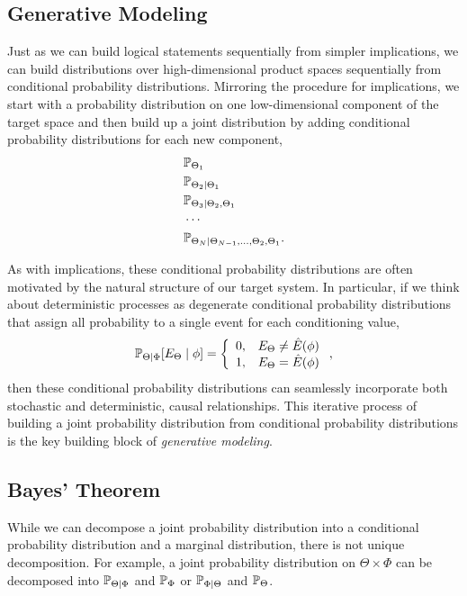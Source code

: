 \subsection{Generative Modeling}

Just as we can build logical statements sequentially from simpler
implications, we can build distributions over high-dimensional product
spaces sequentially from conditional probability distributions.  Mirroring the
procedure for implications, we start with a probability distribution on one 
low-dimensional component of the target space and then build up a joint 
distribution by adding conditional probability distributions for each new 
component,
%
\begin{align*}
& \mathbb{P}_{\Theta_{1}} \\
& \mathbb{P}_{\Theta_{2} \mid \Theta_{1}} \\
& \mathbb{P}_{\Theta_{3} \mid \Theta_{2}, \Theta_{1}} \\
& \cdots \\
& \mathbb{P}_{\Theta_{N} \mid \Theta_{N - 1}, \ldots, \Theta_{2}, \Theta_{1}}.
\end{align*}

As with implications, these conditional probability distributions are often 
motivated by the natural structure of our target system.  In particular, if we 
think about deterministic processes as degenerate conditional probability 
distributions that assign all probability to a single event for each conditioning 
value,
%
\begin{equation*}
\mathbb{P}_{\Theta \mid \Phi} \! \left[ E_{\Theta} \mid \phi \right]
= 
\left\{
\begin{array}{rr}
0, & E_{\Theta} \ne \hat{E} \! \left( \phi \right) \\
1, & E_{\Theta} = \hat{E} \! \left( \phi \right)
\end{array}
\right.,
\end{equation*}
%
then these conditional probability distributions can seamlessly incorporate
both stochastic and deterministic, causal relationships.  This iterative process 
of building a joint probability distribution from conditional probability distributions 
is the key building block of \emph{generative modeling}.

\subsection{Bayes' Theorem}

While we can decompose a joint probability distribution into a conditional
probability distribution and a marginal distribution, there is not unique
decomposition.  For example, a joint probability distribution on 
$\Theta \times \Phi$ can be decomposed into $\mathbb{P}_{\Theta \mid \Phi}$ and
$\mathbb{P}_{\Phi}$ or $\mathbb{P}_{\Phi \mid \Theta}$ and $\mathbb{P}_{\Theta}$.

